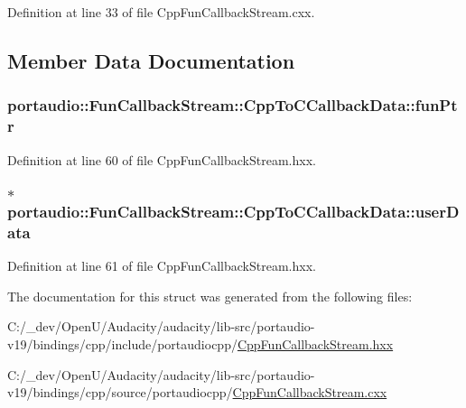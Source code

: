 Definition at line 33 of file Cpp\+Fun\+Callback\+Stream.\+cxx.



\subsection{Member Data Documentation}
\subsubsection[{\texorpdfstring{fun\+Ptr}{funPtr}}]{ portaudio\+::\+Fun\+Callback\+Stream\+::\+Cpp\+To\+C\+Callback\+Data\+::fun\+Ptr}\hypertarget{structportaudio_1_1_fun_callback_stream_1_1_cpp_to_c_callback_data_a0294c57e13534e8892e40890b33f77ab}{}\label{structportaudio_1_1_fun_callback_stream_1_1_cpp_to_c_callback_data_a0294c57e13534e8892e40890b33f77ab}


Definition at line 60 of file Cpp\+Fun\+Callback\+Stream.\+hxx.

\subsubsection[{\texorpdfstring{user\+Data}{userData}}]{$\ast$ portaudio\+::\+Fun\+Callback\+Stream\+::\+Cpp\+To\+C\+Callback\+Data\+::user\+Data}\hypertarget{structportaudio_1_1_fun_callback_stream_1_1_cpp_to_c_callback_data_af10d25bb7290b07e6831ba3d2ad58e47}{}\label{structportaudio_1_1_fun_callback_stream_1_1_cpp_to_c_callback_data_af10d25bb7290b07e6831ba3d2ad58e47}


Definition at line 61 of file Cpp\+Fun\+Callback\+Stream.\+hxx.



The documentation for this struct was generated from the following files\+:\begin{DoxyCompactItemize}
\item 
C\+:/\+\_\+dev/\+Open\+U/\+Audacity/audacity/lib-\/src/portaudio-\/v19/bindings/cpp/include/portaudiocpp/\hyperlink{_cpp_fun_callback_stream_8hxx}{Cpp\+Fun\+Callback\+Stream.\+hxx}\item 
C\+:/\+\_\+dev/\+Open\+U/\+Audacity/audacity/lib-\/src/portaudio-\/v19/bindings/cpp/source/portaudiocpp/\hyperlink{_cpp_fun_callback_stream_8cxx}{Cpp\+Fun\+Callback\+Stream.\+cxx}\end{DoxyCompactItemize}

